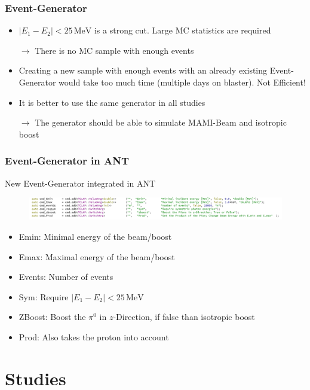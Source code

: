 \documentclass[slidestop,compress,mathserif]{beamer}
\begin{document}
\begin{frame}
\frametitle{Event-Generator}


\begin{itemize}
	\item $|E_1 - E_2| < 25\,\text{MeV}$ is a strong cut. Large MC statistics are required 
	
	$\rightarrow$ There is no MC sample with enough events
	\pause
	
	\item Creating a new sample with enough events with an already existing Event-Generator would take too much time (multiple days on blaster).
	Not Efficient!
	\pause
	
	\item It is better to use the same generator in all studies
	
	$\rightarrow$ The generator should be able to simulate MAMI-Beam and isotropic boost
\end{itemize}
\end{frame}

\begin{frame}
	\frametitle{Event-Generator in ANT}
	New Event-Generator integrated in ANT
	\begin{figure}
		\includegraphics[width=1.1\textwidth]{Pictures/Gun}
		
	\end{figure}
	\begin{itemize}
		\item Emin: Minimal energy of the beam/boost
		\item Emax: Maximal energy of the beam/boost
		\item Events: Number of events
		\item Sym: Require $|E_{1}-E_{2}|<25\,\text{MeV}$
		\item ZBoost: Boost the $\pi^0$ in $z$-Direction, if false than isotropic boost
		\item Prod: Also takes the proton into account
	\end{itemize}
\end{frame}

\section{Studies}
\end{document}
